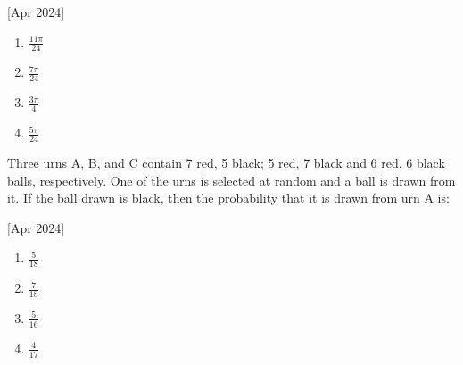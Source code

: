     \hfill[Apr 2024]

        \begin{multicols}{4}
            \begin{enumerate}
                \item $\frac{11\pi}{24}$
                \item $\frac{7\pi}{24}$
                \item $\frac{3\pi}{4}$
                \item $\frac{5\pi}{24}$
            \end{enumerate}
        \end{multicols}

    \item Three urns A, B, and C contain 7 red, 5 black; 5 red, 7 black and 6 red, 6 black balls, respectively. One of the urns is selected at random and a ball is drawn from it. If the ball drawn is black, then the probability that it is drawn from urn A is:
    
    \hfill[Apr 2024]

        \begin{multicols}{4}
            \begin{enumerate}
                \item $\frac{5}{18}$
                \item $\frac{7}{18}$
                \item $\frac{5}{16}$
                \item $\frac{4}{17}$
            \end{enumerate}
        \end{multicols}

